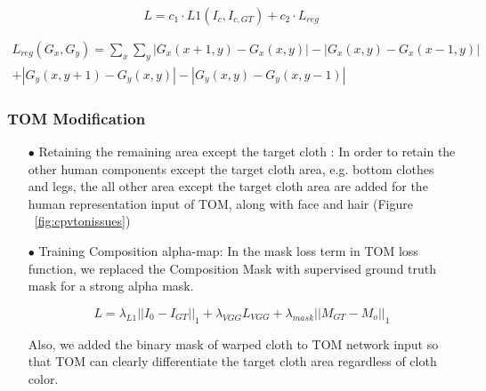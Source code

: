 \begin{itemize}


\begin{equation}
 L  = c_1 \cdot L1(I_c, I_{c,GT}) + c_2 \cdot  L_{reg}  
\end{equation}

\begin{equation}\label{eq:gridloss}
\begin{aligned}
 L_{reg} (G_x, G_y) = \sum_x \sum_y | G_x(x+1, y) - G_x(x, y) | - | G_x(x, y) - G_x(x-1, y) | \\
 + | G_y(x, y+1) - G_y(x, y) | - | G_y(x, y) - G_y(x, y-1) |
\end{aligned}
\end{equation}


\end{itemize}

\subsubsection{TOM Modification}


\begin{itemize}

\item[$\bullet$] Retaining the remaining area except the target cloth  :
In order to retain the other human components except the target cloth area, e.g. bottom clothes and legs, the all other area except the target cloth area are added for the human representation input of TOM, along with face and hair (Figure ~\ref{fig:cpvtonissues})

\item[$\bullet$] Training Composition alpha-map:  
In the mask loss term in TOM loss function, we replaced the Composition Mask with supervised ground truth mask for a strong alpha mask.

\begin{equation}
L = \lambda_{L1} || I_0-I_{GT}||_1+  \lambda_{VGG} L_{VGG} + \lambda_{mask} ||M_{GT}-M_o||_1       
\end{equation}

Also, we added the binary mask of warped cloth to TOM network input so that TOM can clearly differentiate the target cloth area regardless of cloth color.  

\end{itemize}

